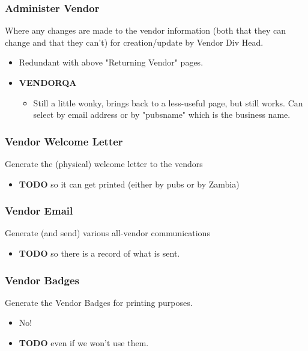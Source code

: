 \documentclass[captions=tablesignature]{scrartcl}
\begin{document}
\subsubsection{Administer Vendor}
\label{sec-3-1-15}
Where any changes are made to the vendor information (both that
they can change and that they can't) for creation/update by Vendor
Div Head.
\begin{itemize}
\item Redundant with above "Returning Vendor" pages.
\end{itemize}
\begin{itemize}
\item {\bfseries\sffamily VENDORQA} 
\label{sec-3-1-15-1}
\begin{itemize}
\item Still a little wonky, brings back to a less-useful page, but
still works.  Can select by email address or by "pubsname"
which is the business name.
\end{itemize}
\end{itemize}

\subsubsection{Vendor Welcome Letter}
\label{sec-3-1-16}
Generate the (physical) welcome letter to the vendors
\begin{itemize}
\item {\bfseries\sffamily TODO} so it can get printed (either by pubs or by Zambia)
\label{sec-3-1-16-1}
\end{itemize}

\subsubsection{Vendor Email}
\label{sec-3-1-17}
Generate (and send) various all-vendor communications
\begin{itemize}
\item {\bfseries\sffamily TODO} so there is a record of what is sent.
\label{sec-3-1-17-1}
\end{itemize}

\subsubsection{Vendor Badges}
\label{sec-3-1-18}
Generate the Vendor Badges for printing purposes.
\begin{itemize}
\item No!
\end{itemize}
\begin{itemize}
\item {\bfseries\sffamily TODO} even if we won't use them.
\label{sec-3-1-18-1}
\end{itemize}
\end{document}
